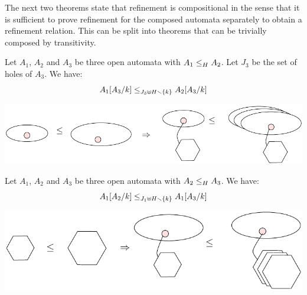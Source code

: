 \documentclass[runningheads]{llncs}
\begin{document}
The next two theorems state that refinement is compositional in the sense that it is sufficient to prove refinement for the composed automata separately to obtain a refinement relation. This can be split into theorems that can be trivially composed by transitivity.
%
%

\begin{theorem}\label{thm:ContextRefinement}
Let $A_1$, $A_2$ and $A_3$ be three open automata with $\wrel{A_1}{A_2}{H}$. 
Let $J_3$ be the set of holes of $A_3$.
We have: \[\wrel{A_1\subst{A_3}{k}}{A_2\subst{A_3}{k}}{J_3 \uplus H \setminus \mbrc{k}}\]
\end{theorem}


\begin{center}
\includegraphics[scale=0.7]{Figures/Theorem2}
\end{center}





\begin{theorem}[Congruence]\label{thm:Congruence}
Let $A_1$, $A_2$ and $A_3$ be three open automata with $\wrel{A_2}{A_3}{H}$. 
We have: \[\wrel{A_1\subst{A_2}{k}}{A_1\subst{A_3}{k}}{J_1 \uplus H \setminus \mbrc{k}}\]
\end{theorem}



\begin{center}
\includegraphics[scale=0.7]{Figures/Theorem1}
\end{center}
\end{document}

